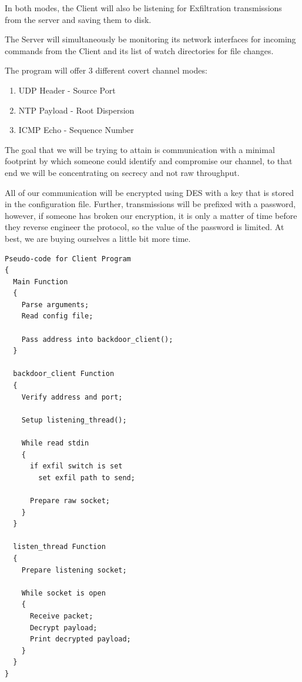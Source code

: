 \documentclass[titlepage]{article}
\begin{document}
In both modes, the Client will also be listening for Exfiltration transmissions from the server and saving them to disk.

The Server will simultaneously be monitoring its network interfaces for incoming commands from the Client and its list of
watch directories for file changes.

The program will offer 3 different covert channel modes:
\begin{enumerate}
  \item UDP Header - Source Port
  \item NTP Payload - Root Dispersion
  \item ICMP Echo - Sequence Number
\end{enumerate}

The goal that we will be trying to attain is communication with a minimal footprint by which someone could identify and compromise our channel, to
that end we will be concentrating on secrecy and not raw throughput.

All of our communication will be encrypted using DES with a key that is stored in the configuration file.  Further, transmissions will be prefixed with a password,
however, if someone has broken our encryption, it is only a matter of time before they reverse engineer the protocol, so the value of the password is limited.
At best, we are buying ourselves a little bit more time.

\begin{lstlisting}
Pseudo-code for Client Program
{
  Main Function
  {
    Parse arguments;
    Read config file;

    Pass address into backdoor_client();
  }

  backdoor_client Function
  {
    Verify address and port;

    Setup listening_thread();

    While read stdin
    {
      if exfil switch is set
        set exfil path to send;

      Prepare raw socket;
    }
  }

  listen_thread Function
  {
    Prepare listening socket;

    While socket is open
    {
      Receive packet;
      Decrypt payload;
      Print decrypted payload;
    }
  }
}
\end{lstlisting}

\clearpage
\end{document}

